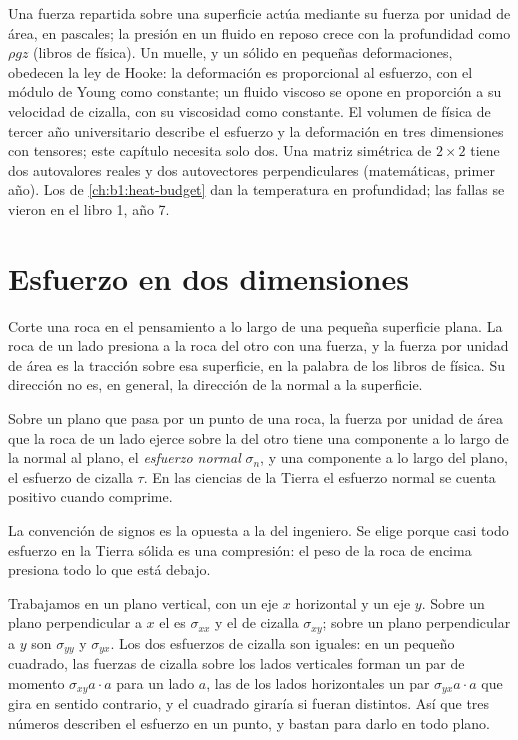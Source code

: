 \begin{recall}
Una fuerza repartida sobre una superficie actúa mediante su fuerza por unidad de área, en pascales; la presión en un fluido en reposo crece con la
profundidad como $\rho g z$ (libros de física). Un muelle, y un sólido en pequeñas deformaciones, obedecen la ley de Hooke: la deformación es
proporcional al esfuerzo, con el módulo de Young como constante; un fluido viscoso se opone en proporción a su velocidad de cizalla, con su viscosidad
como constante. El volumen de física de tercer año universitario describe el esfuerzo y la deformación en tres dimensiones con tensores; este capítulo
necesita solo dos. Una matriz simétrica de $2\times2$ tiene dos autovalores reales y dos autovectores perpendiculares (matemáticas, primer año).
Los  de \cref{ch:b1:heat-budget} dan la temperatura en profundidad; las fallas se vieron en el libro 1, año 7.
\end{recall}

\section{Esfuerzo en dos dimensiones}\label{sec:b1:stress-strain-rheology:stress}

Corte una roca en el pensamiento a lo largo de una pequeña superficie plana. La roca de un lado presiona a la roca del otro con una fuerza, y la fuerza
por unidad de área es la tracción sobre esa superficie, en la palabra de los libros de física. Su dirección no es, en general, la dirección de la normal
a la superficie.

\begin{definition}\label{def:b1:stress-strain-rheology:stress}
Sobre un plano que pasa por un punto de una roca, la fuerza por unidad de área que la roca de un lado ejerce sobre la del otro tiene una componente a lo
largo de la normal al plano, el \emph{esfuerzo normal} $\sigma_n$, y una componente a lo largo del plano, el esfuerzo de cizalla
$\tau$. En las ciencias de la Tierra el esfuerzo normal se cuenta positivo cuando comprime.
\end{definition}

La convención de signos es la opuesta a la del ingeniero. Se elige porque casi todo esfuerzo en la Tierra sólida es una compresión: el peso de la roca de
encima presiona todo lo que está debajo.

Trabajamos en un plano vertical, con un eje $x$ horizontal y un eje $y$. Sobre un plano perpendicular a $x$ el  es $\sigma_{xx}$ y el de
cizalla $\sigma_{xy}$; sobre un plano perpendicular a $y$ son $\sigma_{yy}$ y $\sigma_{yx}$. Los dos esfuerzos de cizalla son iguales: en un pequeño cuadrado,
las fuerzas de cizalla sobre los lados verticales forman un par de momento $\sigma_{xy}a\cdot a$ para un lado $a$, las de los lados horizontales un par
$\sigma_{yx}a\cdot a$ que gira en sentido contrario, y el cuadrado giraría si fueran distintos. Así que tres números describen el esfuerzo en un punto, y bastan
para darlo en todo plano.

